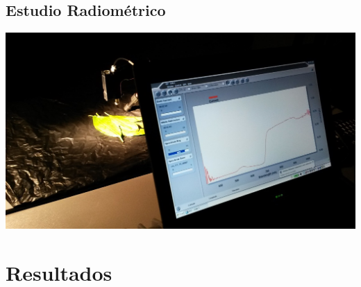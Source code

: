 \documentclass[12pt]{beamer}
\begin{document}
\subsection{Estudio Radiométrico}
\begin{frame}
	\includegraphics[width=\linewidth]{./Imagenes/Curva_espectral.jpg}
\end{frame}

\section{Resultados}
\end{document}

